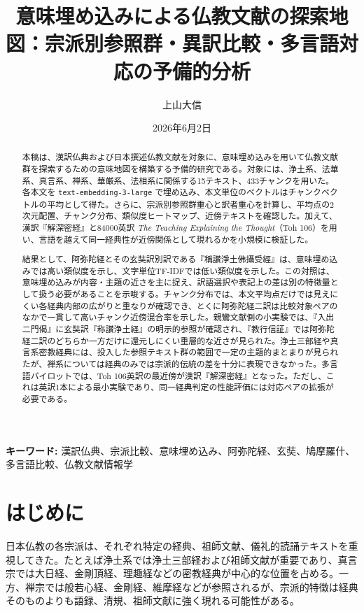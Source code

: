 \documentclass[uplatex,dvipdfmx,11pt,a4paper]{jsarticle}
\title{意味埋め込みによる仏教文献の探索地図：宗派別参照群・異訳比較・多言語対応の予備的分析}
\author{上山大信}
\date{2026年6月2日}
\begin{document}
\maketitle

\begin{abstract}
本稿は、漢訳仏典および日本撰述仏教文献を対象に、意味埋め込みを用いて仏教文献群を探索するための意味地図を構築する予備的研究である。対象には、浄土系、法華系、真言系、禅系、華厳系、法相系に関係する15テキスト、433チャンクを用いた。各本文を \texttt{text-embedding-3-large} で埋め込み、本文単位のベクトルはチャンクベクトルの平均として得た。さらに、宗派別参照群重心と訳者重心を計算し、平均点の2次元配置、チャンク分布、類似度ヒートマップ、近傍テキストを確認した。加えて、漢訳『解深密経』と84000英訳 \textit{The Teaching Explaining the Thought}（Toh 106）を用い、言語を越えて同一経典性が近傍関係として現れるかを小規模に検証した。

結果として、阿弥陀経とその玄奘訳別訳である『稱讃淨土佛攝受經』は、意味埋め込みでは高い類似度を示し、文字単位TF-IDFでは低い類似度を示した。この対照は、意味埋め込みが内容・主題の近さを主に捉え、訳語選択や表記上の差は別の特徴量として扱う必要があることを示唆する。チャンク分布では、本文平均点だけでは見えにくい各経典内部の広がりと重なりが確認でき、とくに阿弥陀経二訳は比較対象ペアのなかで一貫して高いチャンク近傍混合率を示した。親鸞文献側の小実験では、『入出二門偈』に玄奘訳『称讃浄土経』の明示的参照が確認され、『教行信証』では阿弥陀経二訳のどちらか一方だけに還元しにくい重層的な近さが見られた。浄土三部経や真言系密教経典には、投入した参照テキスト群の範囲で一定の主題的まとまりが見られたが、禅系については経典のみでは宗派的伝統の差を十分に表現できなかった。多言語パイロットでは、Toh 106英訳の最近傍が漢訳『解深密経』となった。ただし、これは英訳1本による最小実験であり、同一経典判定の性能評価には対応ペアの拡張が必要である。
\end{abstract}

\noindent\textbf{キーワード:} 漢訳仏典、宗派比較、意味埋め込み、阿弥陀経、玄奘、鳩摩羅什、多言語比較、仏教文献情報学

\section{はじめに}

日本仏教の各宗派は、それぞれ特定の経典、祖師文献、儀礼的読誦テキストを重視してきた。たとえば浄土系では浄土三部経および祖師文献が重要であり、真言宗では大日経、金剛頂経、理趣経などの密教経典が中心的な位置を占める。一方、禅宗では般若心経、金剛経、維摩経などが参照されるが、宗派的特徴は経典そのものよりも語録、清規、祖師文献に強く現れる可能性がある。
\end{document}
